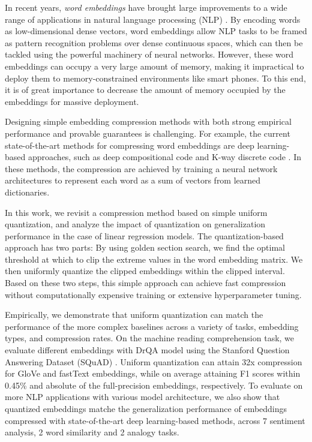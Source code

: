 In recent years, \textit{word embeddings} \citep{word2vec13,glove14,fasttext18} have brought large improvements to a wide range of applications in natural language processing (NLP) \citep{collins16,drqa17}.
By encoding words as low-dimensional dense vectors, word embeddings allow NLP tasks to be framed as pattern recognition problems over dense continuous spaces, which can then be tackled using the powerful machinery of neural networks.
However, these word embeddings can occupy a very large amount of memory, making it impractical to deploy them to memory-constrained environments like smart phones.
To this end, it is of great importance to decrease the amount of memory occupied by the embeddings for massive deployment.


Designing simple embedding compression methods with both strong empirical performance and provable guarantees is challenging.
For example, the current state-of-the-art methods for compressing word embeddings are deep learning-based approaches, such as deep compositional code \citep{dccl17} and K-way discrete code \citep{chen2018learning}. In these methods, the compression are achieved by training a neural network architectures to represent each word as a sum of vectors from learned dictionaries.


In this work, we revisit a compression method based on simple uniform quantization, and analyze the impact of quantization on generalization performance in the case of linear regression models.
The quantization-based approach has two parts: By using golden section search, we find the optimal threshold at which to clip the extreme values in the word embedding matrix. We then uniformly quantize the clipped embeddings within the clipped interval. Based on these two steps, this simple approach can achieve fast compression without computationally expensive training or extensive hyperparameter tuning.

Empirically, we demonstrate that uniform quantization can match the performance of the more complex baselines across a variety of tasks, embedding types, and compression rates.
On the machine reading comprehension task, we evaluate different embeddings with DrQA model \cite{drqa17} using the Stanford Question Answering Dataset (SQuAD) \citep{squad16}. Uniform quantization can attain 32x compression for GloVe and fastText embeddings, while on average attaining F1 scores within 0.45\% and  absolute of the full-precision embeddings, respectively. To evaluate on more NLP applications with various model architecture, we also show that quantized embeddings matche the generalization performance of embeddings compressed with state-of-the-art deep learning-based methods, across 7 sentiment analysis, 2 word similarity and 2 analogy tasks. 

